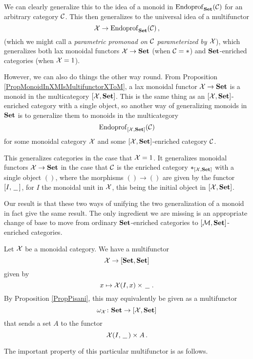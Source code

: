 \documentclass{report}[11pt]
\begin{document}
We can clearly generalize this to the idea of a monoid in $\operatorname{Endoprof}_{\normalfont\textbf{Set}}({\mathcal{C}})$ for an arbitrary category ${\mathcal{C}}$.  
This then generalizes to the universal idea of a multifunctor
\[
  \mathcal X \to \operatorname{Endoprof}_{\normalfont\textbf{Set}}({\mathcal{C}})\,,
  \]
(which we might call a \emph{parametric promonad on ${\mathcal{C}}$ parameterized by $\mathcal X$}), which generalizes both lax monoidal functors $\mathcal X \to {\normalfont\textbf{Set}}$ (when ${\mathcal{C}}=*$) and ${\normalfont\textbf{Set}}$-enriched categories (when $\mathcal X=1$).

However, we can also do things the other way round.  
From Proposition \ref{PropMonoidInXMIsMultifunctorXToM}, a lax monoidal functor $\mathcal X \to {\normalfont\textbf{Set}}$ is a monoid in the multicategory $[\mathcal X,{\normalfont\textbf{Set}}]$.  
This is the same thing as an $[\mathcal X,{\normalfont\textbf{Set}}]$-enriched category with a single object, so another way of generalizing monoids in ${\normalfont\textbf{Set}}$ is to generalize them to monoids in the multicategory
\[
  \operatorname{Endoprof}_{[\mathcal X,{\normalfont\textbf{Set}}]}({\mathcal{C}})
  \]
for some monoidal category $\mathcal X$ and some $[\mathcal X,{\normalfont\textbf{Set}}]$-enriched category ${\mathcal{C}}$.

This generalizes categories in the case that $\mathcal X=1$.  
It generalizes monoidal functors $\mathcal X \to {\normalfont\textbf{Set}}$ in the case that ${\mathcal{C}}$ is the enriched category $*_{[\mathcal X,{\normalfont\textbf{Set}}]}$ with a single object $()$, where the morphisms $() \to ()$ are given by the functor $[I,\,\underline{\hspace{1.5ex}}\,]$, for $I$ the monoidal unit in $\mathcal X$, this being the initial object in $[\mathcal X,{\normalfont\textbf{Set}}]$.

Our result is that these two ways of unifying the two generalization of a monoid in fact give the same result.  
The only ingredient we are missing is an appropriate change of base to move from ordinary ${\normalfont\textbf{Set}}$-enriched categories to $[\mathcal M,{\normalfont\textbf{Set}}]$-enriched categories.

\begin{definition}
  Let $\mathcal X$ be a monoidal category.  
  We have a multifunctor
  \[
    \mathcal X \to [{\normalfont\textbf{Set}},{\normalfont\textbf{Set}}]
    \]
  given by
  \[
    x \mapsto \mathcal X(I,x) \times \,\underline{\hspace{1.5ex}}\,\,.
    \]
  By Proposition \ref{PropPisani}, this may equivalently be given as a multifunctor
  \[
    \omega_\mathcal X\colon{\normalfont\textbf{Set}} \to [\mathcal X,{\normalfont\textbf{Set}}]
    \]
  that sends a set $A$ to the functor
  \[
    \mathcal X(I,\,\underline{\hspace{1.5ex}}\,)\times A\,.
    \]
\end{definition}

The important property of this particular multifunctor is as follows.
\end{document}
